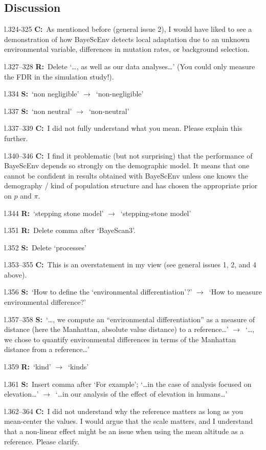 \documentclass[11pt]{article}
\newenvironment{my_description}
{\begin{description}
  \setlength{\itemsep}{2pt}
  \setlength{\parskip}{0pt}
  \setlength{\parsep}{0pt}}
{\end{description}}
\newcommand{\ra}{$\rightarrow$\ }
\newcommand{\C}{\textbf{C:}\ }
\newcommand{\R}{\textbf{R:}\ }
\newcommand{\V}{\textbf{S:}\ }
\begin{document}
\subsection{Discussion}
\begin{my_description}
	\item[l.324-325] \C As mentioned before (general issue 2), I would have liked to see a demonstration of how BayeScEnv detects local adaptation due to an unknown environmental variable, differences in mutation rates, or background selection.
	\item[l.327--328] \R Delete `\dots, as well as our data analyses\dots' (You could only measure the FDR in the simulation study!).
	\item[l.334] \V `non negligible' \ra `non-negligible'
	\item[l.337] \V `non neutral' \ra `non-neutral'
	\item[l.337--339] \C I did not fully understand what you mean. Please explain this further.
	\item[l.340--346] \C I find it problematic (but not surprising) that the performance of BayeScEnv depends so strongly on the demographic model. It means that one cannot be confident in results obtained with BayeScEnv unless one knows the demography / kind of population structure and has chosen the appropriate prior on $p$ and $\pi$.
	\item[l.344] \R `stepping stone model' \ra `stepping-stone model'
	\item[l.351] \R Delete comma after `BayeScan3'.
	\item[l.352] \V Delete `processes'
	\item[l.353--355] \C This is an overstatement in my view (see general issues 1, 2, and 4 above).
	\item[l.356] \V `How to define the `environmental differentiation'?' \ra `How to measure environmental difference?'
	\item[l.357--358] \V `\dots, we compute an ``environmental differentiation'' as a measure of distance (here the Manhattan, absolute value distance) to a reference\dots' \ra `\dots, we chose to quantify environmental differences in terms of the Manhattan distance from a reference\dots'
	\item[l.359] \R `kind' \ra `kinds'
	\item[l.361] \V Insert comma after `For example'; `\dots in the case of analysis focused on elevation\dots' \ra `\dots in our analysis of the effect of elevation in humans\dots'
	\item[l.362--364] \C I did not understand why the reference matters as long as you mean-center the values. I would argue that the scale matters, and I understand that a non-linear effect might be an issue when using the mean altitude as a reference. Please clarify.

\end{my_description}
\end{document}
